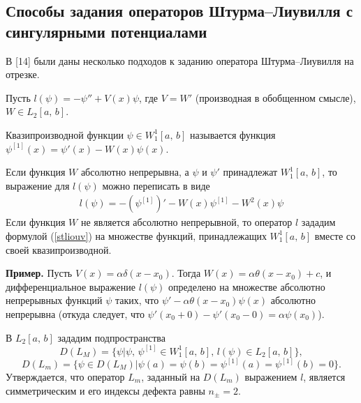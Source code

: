 \documentclass[a4paper
]{article}
\begin{document}
\subsection{Способы задания операторов Штурма--Лиувилля с сингулярными
потенциалами} В [14] были даны несколько подходов к заданию
оператора Штурма--Лиувилля на отрезке. \par Пусть
$l(\psi)=-\psi''+V(x)\psi$, где $V=W'$ (производная в обобщенном
смысле), $W\in L_2[a, \, b]$.
\begin{Def}
Квазипроизводной функции $\psi\in W^1_1[a, \, b]$ называется функция
$\psi^{[1]}(x)=\psi'(x)-W(x)\psi(x)$.
\end{Def}
Если функция $W$ абсолютно непрерывна, а $\psi$ и $\psi'$ принадлежат
$W^1_1[a, \, b]$, то выражение для $l(\psi)$ можно переписать в виде
\begin{align}
\label{stliouv}
l(\psi)=-(\psi^{[1]})'-W(x)\psi^{[1]}-W^2(x)\psi
\end{align}
Если функция $W$ не является абсолютно непрерывной, то оператор $l$
зададим формулой (\ref{stliouv}) на множестве функций, принадлежащих
$W^1_1[a, \, b]$ вместе со своей квазипроизводной. \par
{\bf Пример.} Пусть $V(x)=\alpha \delta(x-x_0)$. Тогда $W(x)=\alpha
\theta(x-x_0)+c$, и дифференциальное выражение $l(\psi)$ определено на
множестве абсолютно непрерывных функций $\psi$ таких, что $\psi'-
\alpha \theta(x-x_0)\psi(x)$ абсолютно непрерывна (откуда следует, что
$\psi'(x_0+0)-\psi'(x_0-0)=\alpha \psi(x_0)$). \par
В $L_2[a, \, b]$ зададим подпространства $$D(L_M)=\{\psi|\psi, \,
\psi^{[1]}\in W^1_1[a, \, b], \, l(\psi)\in L_2[a, \, b]\},$$
$$D(L_m)=\{\psi\in D(L_M)|\psi(a)=\psi(b)=\psi^{[1]}(a)=\psi^{[1]}
(b)=0\}.$$ Утверждается, что оператор $L_m$, заданный на $D(L_m)$
выражением $l$, является симметрическим и его индексы дефекта равны $n_{\pm}
=2$.
\end{document}
